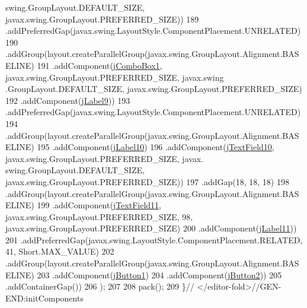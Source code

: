 \begin{DoxyCode}
      swing.GroupLayout.DEFAULT\_SIZE, javax.swing.GroupLayout.PREFERRED\_SIZE))
189                 .addPreferredGap(javax.swing.LayoutStyle.ComponentPlacement.UNRELATED)
190                 .addGroup(layout.createParallelGroup(javax.swing.GroupLayout.Alignment.BASELINE)
191                     .addComponent(\mbox{\hyperlink{class_interfaz_package_1_1_alta_libro_lectura_ac1e5e88822746a9f922ab99cab5fd21b}{jComboBox1}}, javax.swing.GroupLayout.PREFERRED\_SIZE, javax.swing
      .GroupLayout.DEFAULT\_SIZE, javax.swing.GroupLayout.PREFERRED\_SIZE)
192                     .addComponent(\mbox{\hyperlink{class_interfaz_package_1_1_alta_libro_lectura_aee8f7c9887d32f72c8bd2e6e9808c524}{jLabel9}}))
193                 .addPreferredGap(javax.swing.LayoutStyle.ComponentPlacement.UNRELATED)
194                 .addGroup(layout.createParallelGroup(javax.swing.GroupLayout.Alignment.BASELINE)
195                     .addComponent(\mbox{\hyperlink{class_interfaz_package_1_1_alta_libro_lectura_a1ba04a625fc1945d471079471ff341bf}{jLabel10}})
196                     .addComponent(\mbox{\hyperlink{class_interfaz_package_1_1_alta_libro_lectura_a937dab20a07279280f73c9b235398043}{jTextField10}}, javax.swing.GroupLayout.PREFERRED\_SIZE, javax.
      swing.GroupLayout.DEFAULT\_SIZE, javax.swing.GroupLayout.PREFERRED\_SIZE))
197                 .addGap(18, 18, 18)
198                 .addGroup(layout.createParallelGroup(javax.swing.GroupLayout.Alignment.BASELINE)
199                     .addComponent(\mbox{\hyperlink{class_interfaz_package_1_1_alta_libro_lectura_a0de30e644010e7a1c4aab54936597f18}{jTextField11}}, javax.swing.GroupLayout.PREFERRED\_SIZE, 98, 
      javax.swing.GroupLayout.PREFERRED\_SIZE)
200                     .addComponent(\mbox{\hyperlink{class_interfaz_package_1_1_alta_libro_lectura_ada3bdfc583114e6ba88ce12cb9ba9a3f}{jLabel11}}))
201                 .addPreferredGap(javax.swing.LayoutStyle.ComponentPlacement.RELATED, 41, Short.MAX\_VALUE)
202                 .addGroup(layout.createParallelGroup(javax.swing.GroupLayout.Alignment.BASELINE)
203                     .addComponent(\mbox{\hyperlink{class_interfaz_package_1_1_alta_libro_lectura_abd046e1ca910f6419304b648e1e0ecaa}{jButton1}})
204                     .addComponent(\mbox{\hyperlink{class_interfaz_package_1_1_alta_libro_lectura_a10ae90b6c76399e4509186a1b9d80f42}{jButton2}}))
205                 .addContainerGap())
206         );
207 
208         pack();
209     \}\textcolor{comment}{// </editor-fold>//GEN-END:initComponents}
\end{DoxyCode}
\mbox{\label{class_interfaz_package_1_1_alta_libro_lectura_a4e1677bb3bfc8c979526999d21973269}} 
